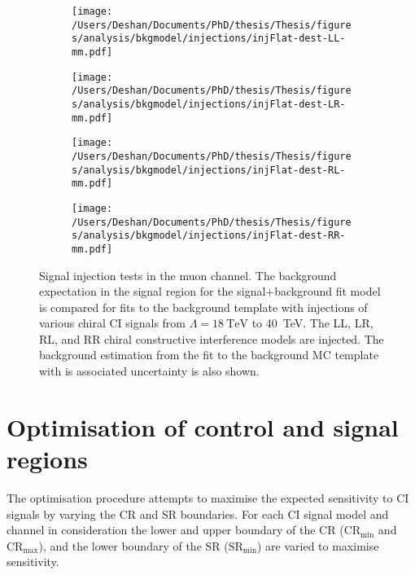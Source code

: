 \begin{figure}[h!]
    \centering
    \begin{subfigure}[b]{0.49\textwidth}
        \centering
        \texttt{[image: /Users/Deshan/Documents/PhD/thesis/Thesis/figures/analysis/bkgmodel/injections/injFlat-dest-LL-mm.pdf]}
        \label{fig:bkgmodel:injmm2}
    \end{subfigure}
    \begin{subfigure}[b]{0.49\textwidth}
        \centering
        \texttt{[image: /Users/Deshan/Documents/PhD/thesis/Thesis/figures/analysis/bkgmodel/injections/injFlat-dest-LR-mm.pdf]}
        \label{fig:bkgmodel:injmm4}
    \end{subfigure}
    \begin{subfigure}[b]{0.49\textwidth}
        \centering
        \texttt{[image: /Users/Deshan/Documents/PhD/thesis/Thesis/figures/analysis/bkgmodel/injections/injFlat-dest-RL-mm.pdf]}
        \label{fig:bkgmodel:injmm6}
    \end{subfigure}
    \begin{subfigure}[b]{0.49\textwidth}
        \centering
        \texttt{[image: /Users/Deshan/Documents/PhD/thesis/Thesis/figures/analysis/bkgmodel/injections/injFlat-dest-RR-mm.pdf]}
        \label{fig:bkgmodel:injmm8}
    \end{subfigure}
    \caption[Signal injection tests in the muon channel for destructive interference models]{Signal injection tests in the muon channel. The background expectation in the signal region for the signal+background fit model is compared for fits to the background template with injections of various chiral CI signals from $\Lambda = \SI{18}{\tera\electronvolt}$ to \SI{40}{\tera\electronvolt}. The LL, LR, RL, and RR chiral constructive interference models are injected. The background estimation from the fit to the background MC template with is associated uncertainty is also shown.}
    \label{fig:bkgmodel:injmmdest}
\end{figure}

\clearpage

\section{Optimisation of control and signal regions}\label{sec:extrap:optimisation}
The optimisation procedure attempts to maximise the expected sensitivity to CI signals by varying the CR and SR boundaries. For each CI signal model and channel in consideration the lower and upper boundary of the CR ($\mathrm{CR}_{\mathrm{min}}$ and $\mathrm{CR}_{\mathrm{max}}$), and the lower boundary of the SR ($\mathrm{SR}_{\mathrm{min}}$) are varied to maximise sensitivity. 

